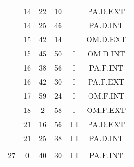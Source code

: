 \documentclass[12pt, a4paper]{article}
\begin{document}
\begin{multicols}{3}
{\begin{tabular}{c c c c c c}
	 	 	 	 & 14 & 22 & 10 & I & PA.D.EXT\\%
	 	 	 	 & 14 & 25 & 46 & I & PA.D.INT\\%
	 	 	 	 & 15 & 42 & 14 & I & OM.D.EXT\\%
	 	 	 	 & 15 & 45 & 50 & I & OM.D.INT\\%
	 	 	 	 & 16 & 38 & 56 & I & PA.F.INT\\%
	 	 	 	 & 16 & 42 & 30 & I & PA.F.EXT\\%
	 	 	 	 & 17 & 59 & 24 & I & OM.F.INT\\%
	 	 	 	 & 18 & 2 & 58 & I & OM.F.EXT\\%
	 	 	 	 & 21 & 16 & 56 & III & PA.D.EXT\\%
	 	 	 	 & 21 & 25 & 38 & III & PA.D.INT\\%
	 	 	 	 & & & & & \\%
	 	 	 	27 & 0 & 40 & 30 & III & PA.F.INT\\%
	 	 \end{tabular}
 	}
\end{multicols}
\end{document}
